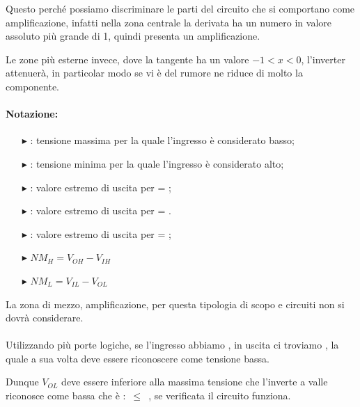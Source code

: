 Questo perché possiamo discriminare le parti del circuito che si comportano come amplificazione, infatti nella zona centrale la derivata ha un numero in valore assoluto più grande di 1, quindi presenta un amplificazione.

Le zone più esterne invece, dove la tangente ha un valore $-1 < x < 0$, l'inverter attenuerà, in particolar modo se vi è del rumore ne riduce di molto la componente.  

\paragraph{Notazione: }

\begin{itemize}
    \item[$\blacktriangleright$]    \textbf{\vil} : tensione	massima	per	la	quale l’ingresso	è	considerato	basso;

    \item[$\blacktriangleright$] \textbf{\vih} : tensione	minima	per	la	quale l’ingresso	è	considerato	alto;

    \item[$\blacktriangleright$] \textbf{\vol}: valore estremo	di	uscita	per \vi = \vih;
    \item[$\blacktriangleright$] \textbf{\voh}: valore  estremo di uscita per \vi = \vil.
    \item[$\blacktriangleright$] \textbf{\vol}: valore estremo	di	uscita	per \vi = \vih;
    \item[]
    \item[$\blacktriangleright$] $NM_H = V_{OH} - V_{IH}$ 
    \item[$\blacktriangleright$] $NM_L = V_{IL} - V_{OL}$ 
\end{itemize}

La zona di mezzo, amplificazione, per questa tipologia di scopo e circuiti non si dovrà considerare.


\paragraph{}

Utilizzando più porte logiche, se l'ingresso abbiamo \vih, in uscita ci troviamo \vol, la quale a sua volta deve essere riconoscere come tensione bassa.

Dunque $V_{OL}$ deve essere inferiore alla massima tensione che l'inverte a valle riconosce come bassa che è \vil : \vol $\,\leq\,$ \vil, se verificata il circuito funziona.

